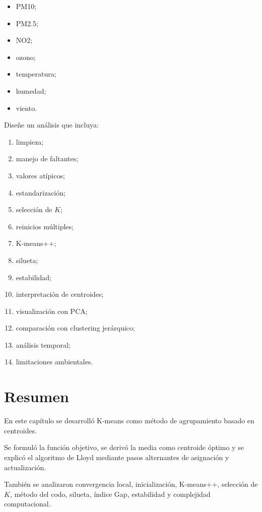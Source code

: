 \documentclass[
  spanish,
  10.5pt,
  letterpaper,
  DIV=11,
  numbers=noendperiod,
  oneside,
  open=any]{scrreprt}
\providecommand{\tightlist}{%
  \setlength{\itemsep}{0pt}\setlength{\parskip}{0pt}}
\theoremstyle{definition}
\theoremstyle{definition}
\theoremstyle{plain}
\theoremstyle{remark}
\begin{document}
\begin{itemize}
\tightlist
\item
  PM10;
\item
  PM2.5;
\item
  NO2;
\item
  ozono;
\item
  temperatura;
\item
  humedad;
\item
  viento.
\end{itemize}

Diseñe un análisis que incluya:

\begin{enumerate}
\def\labelenumi{\arabic{enumi}.}
\tightlist
\item
  limpieza;
\item
  manejo de faltantes;
\item
  valores atípicos;
\item
  estandarización;
\item
  selección de \(K\);
\item
  reinicios múltiples;
\item
  K-means++;
\item
  silueta;
\item
  estabilidad;
\item
  interpretación de centroides;
\item
  visualización con PCA;
\item
  comparación con clustering jerárquico;
\item
  análisis temporal;
\item
  limitaciones ambientales.
\end{enumerate}

\section*{Resumen}\label{resumen-16}


En este capítulo se desarrolló K-means como método de agrupamiento
basado en centroides.

Se formuló la función objetivo, se derivó la media como centroide óptimo
y se explicó el algoritmo de Lloyd mediante pasos alternantes de
asignación y actualización.

También se analizaron convergencia local, inicialización, K-means++,
selección de \(K\), método del codo, silueta, índice Gap, estabilidad y
complejidad computacional.
\end{document}
